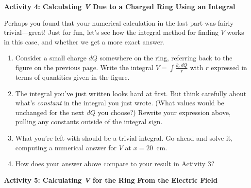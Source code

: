 \pagebreak[2]
\textbf{Activity 4: Calculating \textit{V} Due to a Charged Ring Using an Integral}

Perhaps you found that your numerical calculation in the last part was fairly trivial---great!  Just for fun, let's see how the integral method for finding $V$ works in this case, and whether we get a more exact answer.

\begin{enumerate}[wide, label=(\emph{\alph*})]

\item Consider a small charge $dQ$ somewhere on the ring, referring back to the figure on the previous page.  Write the integral  
$\displaystyle V=\int{\frac{k_e\,dQ}{r}}$
with $r$ expressed in terms of quantities given in the figure.
\answerspace{0.6in}

\item The integral you've just written looks hard at first.  But think carefully about what's \textit{constant} in the integral you just wrote.  (What values would be unchanged for the next $dQ$ you choose?)  Rewrite your expression above, pulling any constants outside of the integral sign.
\answerspace{0.5in}

\item What you're left with should be a trivial integral.  Go ahead and solve it, computing a numerical answer for $V$ at $x = 20$~cm.
\answerspace{0.7in}


\item How does your answer above compare to your result in Activity 3?
\answerspace{0.3in}
\end{enumerate}

\textbf{Activity 5: Calculating \textit{V} for the Ring From the Electric Field}

\bigskip


